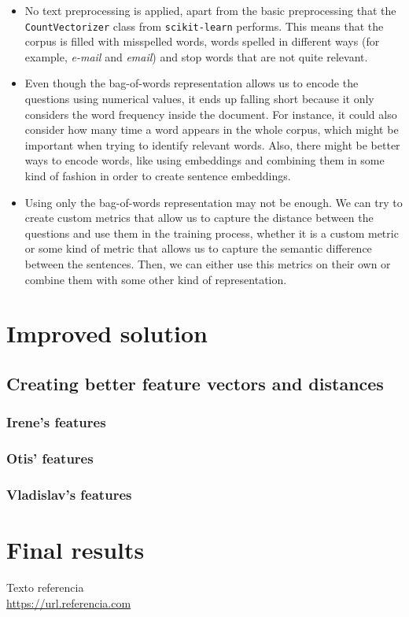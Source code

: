 \documentclass[11pt,a4paper]{article}
\begin{document}
\begin{itemize}
  \item No text preprocessing is applied, apart from the basic preprocessing that
  the \texttt{CountVectorizer} class from \texttt{scikit-learn} performs. This means
  that the corpus is filled with misspelled words, words spelled in different ways
  (for example, \emph{e-mail} and \emph{email}) and stop words that are not quite
  relevant.
  \item Even though the bag-of-words representation allows us to encode the questions
  using numerical values, it ends up falling short because it only considers the word
  frequency inside the document. For instance, it could also consider how many time a
  word appears in the whole corpus, which might be important when trying to identify
  relevant words. Also, there might be better ways to encode words, like using embeddings
  and combining them in some kind of fashion in order to create sentence embeddings.
  \item Using only the bag-of-words representation may not be enough. We can try to create
  custom metrics that allow us to capture the distance between the questions and use them
  in the training process, whether it is a custom metric or some kind of metric that allows
  us to capture the semantic difference between the sentences. Then, we can either use this
  metrics on their own or combine them with some other kind of representation.
\end{itemize}

\section{Improved solution}

\subsection{Creating better feature vectors and distances}

\subsubsection{Irene's features}

\subsubsection{Otis' features}

\subsubsection{Vladislav's features}

\section{Final results}

\newpage

\begin{thebibliography}{5}

Texto referencia
\\\url{https://url.referencia.com}

\end{thebibliography}
\end{document}
